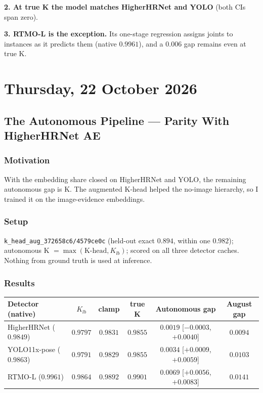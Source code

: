 \textbf{2. At true K the model matches HigherHRNet and YOLO} (both CIs span zero).

\textbf{3. RTMO-L is the exception.} Its one-stage regression assigns joints to instances as it predicts them (native $0.9961$), and a $0.006$ gap remains even at true K.

\section[2026/10/22]{Thursday, 22 October 2026}

\subsection{The Autonomous Pipeline --- Parity With HigherHRNet AE}

\subsubsection{Motivation}

With the embedding share closed on HigherHRNet and YOLO, the remaining autonomous gap is K. The augmented K-head helped the no-image hierarchy, so I trained it on the image-evidence embeddings.

\subsubsection{Setup}

\texttt{k\_head\_aug\_372658c6/4579ce0c} (held-out exact $0.894$, within one $0.982$); autonomous K $= \max(\text{K-head}, K_{lb})$; scored on all three detector caches. Nothing from ground truth is used at inference.

\subsubsection{Results}

\begin{tabular}{lccccc}
\hline
\textbf{Detector (native)} & \textbf{$K_{lb}$} & \textbf{clamp} & \textbf{true K} & \textbf{Autonomous gap} & \textbf{August gap} \\
\hline
HigherHRNet ($0.9849$)   & $0.9797$ & $\mathbf{0.9831}$ & $0.9855$ & $\mathbf{0.0019}$ [$-0.0003$, $+0.0040$] & $0.0094$ \\
YOLO11x-pose ($0.9863$)  & $0.9791$ & $\mathbf{0.9829}$ & $0.9855$ & $0.0034$ [$+0.0009$, $+0.0059$] & $0.0103$ \\
RTMO-L ($0.9961$)        & $0.9864$ & $\mathbf{0.9892}$ & $0.9901$ & $0.0069$ [$+0.0056$, $+0.0083$] & $0.0141$ \\
\hline
\end{tabular}


